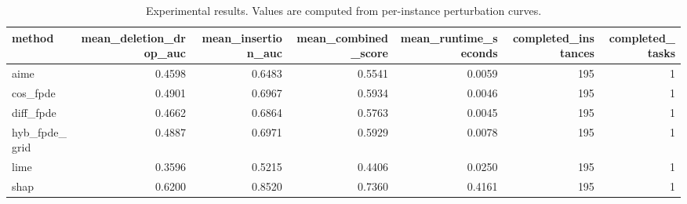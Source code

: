 \begin{table}[t]
\caption{Experimental results. Values are computed from per-instance perturbation curves.}
\label{tab:main_results_computed}
\centering
\begin{tabular}{lrrrrrr}
\toprule
method & mean\_deletion\_drop\_auc & mean\_insertion\_auc & mean\_combined\_score & mean\_runtime\_seconds & completed\_instances & completed\_tasks \\
\midrule
aime & 0.4598 & 0.6483 & 0.5541 & 0.0059 & 195 & 1 \\
cos\_fpde & 0.4901 & 0.6967 & 0.5934 & 0.0046 & 195 & 1 \\
diff\_fpde & 0.4662 & 0.6864 & 0.5763 & 0.0045 & 195 & 1 \\
hyb\_fpde\_grid & 0.4887 & 0.6971 & 0.5929 & 0.0078 & 195 & 1 \\
lime & 0.3596 & 0.5215 & 0.4406 & 0.0250 & 195 & 1 \\
shap & 0.6200 & 0.8520 & 0.7360 & 0.4161 & 195 & 1 \\
\bottomrule
\end{tabular}

\end{table}
